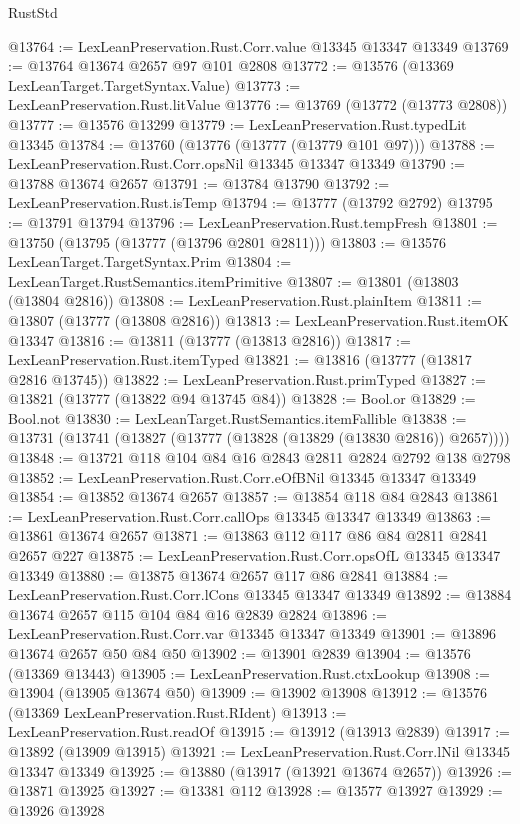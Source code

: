 \begin{lexlean}{RustStd}
\begin{coremodule}
@13764 := LexLeanPreservation.Rust.Corr.value @13345 @13347 @13349
@13769 := @13764 @13674 @2657 @97 @101 @2808
@13772 := @13576 (@13369 LexLeanTarget.TargetSyntax.Value)
@13773 := LexLeanPreservation.Rust.litValue
@13776 := @13769 (@13772 (@13773 @2808))
@13777 := @13576 @13299
@13779 := LexLeanPreservation.Rust.typedLit @13345
@13784 := @13760 (@13776 (@13777 (@13779 @101 @97)))
@13788 := LexLeanPreservation.Rust.Corr.opsNil @13345 @13347 @13349
@13790 := @13788 @13674 @2657
@13791 := @13784 @13790
@13792 := LexLeanPreservation.Rust.isTemp
@13794 := @13777 (@13792 @2792)
@13795 := @13791 @13794
@13796 := LexLeanPreservation.Rust.tempFresh
@13801 := @13750 (@13795 (@13777 (@13796 @2801 @2811)))
@13803 := @13576 LexLeanTarget.TargetSyntax.Prim
@13804 := LexLeanTarget.RustSemantics.itemPrimitive
@13807 := @13801 (@13803 (@13804 @2816))
@13808 := LexLeanPreservation.Rust.plainItem
@13811 := @13807 (@13777 (@13808 @2816))
@13813 := LexLeanPreservation.Rust.itemOK @13347
@13816 := @13811 (@13777 (@13813 @2816))
@13817 := LexLeanPreservation.Rust.itemTyped
@13821 := @13816 (@13777 (@13817 @2816 @13745))
@13822 := LexLeanPreservation.Rust.primTyped
@13827 := @13821 (@13777 (@13822 @94 @13745 @84))
@13828 := Bool.or
@13829 := Bool.not
@13830 := LexLeanTarget.RustSemantics.itemFallible
@13838 := @13731 (@13741 (@13827 (@13777 (@13828 (@13829 (@13830 @2816)) @2657))))
@13848 := @13721 @118 @104 @84 @16 @2843 @2811 @2824 @2792 @138 @2798
@13852 := LexLeanPreservation.Rust.Corr.eOfBNil @13345 @13347 @13349
@13854 := @13852 @13674 @2657
@13857 := @13854 @118 @84 @2843
@13861 := LexLeanPreservation.Rust.Corr.callOps @13345 @13347 @13349
@13863 := @13861 @13674 @2657
@13871 := @13863 @112 @117 @86 @84 @2811 @2841 @2657 @227
@13875 := LexLeanPreservation.Rust.Corr.opsOfL @13345 @13347 @13349
@13880 := @13875 @13674 @2657 @117 @86 @2841
@13884 := LexLeanPreservation.Rust.Corr.lCons @13345 @13347 @13349
@13892 := @13884 @13674 @2657 @115 @104 @84 @16 @2839 @2824
@13896 := LexLeanPreservation.Rust.Corr.var @13345 @13347 @13349
@13901 := @13896 @13674 @2657 @50 @84 @50
@13902 := @13901 @2839
@13904 := @13576 (@13369 @13443)
@13905 := LexLeanPreservation.Rust.ctxLookup
@13908 := @13904 (@13905 @13674 @50)
@13909 := @13902 @13908
@13912 := @13576 (@13369 LexLeanPreservation.Rust.RIdent)
@13913 := LexLeanPreservation.Rust.readOf
@13915 := @13912 (@13913 @2839)
@13917 := @13892 (@13909 @13915)
@13921 := LexLeanPreservation.Rust.Corr.lNil @13345 @13347 @13349
@13925 := @13880 (@13917 (@13921 @13674 @2657))
@13926 := @13871 @13925
@13927 := @13381 @112
@13928 := @13577 @13927
@13929 := @13926 @13928

\end{coremodule}
\end{lexlean}
